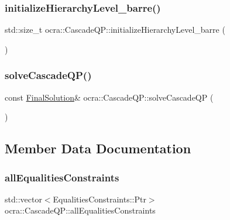 \hypertarget{classocra_1_1CascadeQP_af18be26b3ac162b19f830306b8703813}{}\label{classocra_1_1CascadeQP_af18be26b3ac162b19f830306b8703813} 
\subsubsection{\texorpdfstring{initialize\+Hierarchy\+Level\+\_\+barre()}{initializeHierarchyLevel\_barre()}}
{\footnotesize\ttfamily std\+::size\+\_\+t ocra\+::\+Cascade\+Q\+P\+::initialize\+Hierarchy\+Level\+\_\+barre (\begin{DoxyParamCaption}{ }\end{DoxyParamCaption})\hspace{0.3cm}{\ttfamily [protected]}}

\hypertarget{classocra_1_1CascadeQP_a11e01b608414badd9af6794076eb8b33}{}\label{classocra_1_1CascadeQP_a11e01b608414badd9af6794076eb8b33} 
\subsubsection{\texorpdfstring{solve\+Cascade\+Q\+P()}{solveCascadeQP()}}
{\footnotesize\ttfamily const \hyperlink{structocra_1_1FinalSolution}{Final\+Solution}\& ocra\+::\+Cascade\+Q\+P\+::solve\+Cascade\+QP (\begin{DoxyParamCaption}{ }\end{DoxyParamCaption})}



\subsection{Member Data Documentation}
\hypertarget{classocra_1_1CascadeQP_a53b7452856aa410a83316214d3fe66ad}{}\label{classocra_1_1CascadeQP_a53b7452856aa410a83316214d3fe66ad} 
\subsubsection{\texorpdfstring{all\+Equalities\+Constraints}{allEqualitiesConstraints}}
{\footnotesize\ttfamily std\+::vector$<$Equalities\+Constraints\+::\+Ptr$>$ ocra\+::\+Cascade\+Q\+P\+::all\+Equalities\+Constraints\hspace{0.3cm}{\ttfamily [protected]}}



